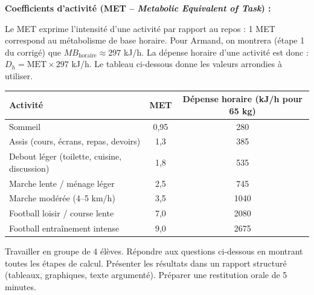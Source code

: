 \documentclass[11pt]{article}
\newcounter{popsec}
\newcounter{popsub}
\newcommand{\courssub}[1]{%
  \stepcounter{popsub}%
  \par\vspace{9pt}\noindent{\popxbold\fontsize{11.5}{13}\selectfont\color{popink}{\color{poporange}\thepopsec.\thepopsub}\hspace{6pt}#1}\par\nopagebreak\vspace{4pt}
}
\begin{document}
\par
\textbf{Coefficients d'activité (MET -- \emph{Metabolic Equivalent of Task}) :}
\par
Le MET exprime l'intensité d'une activité par rapport au repos : 1 MET correspond au métabolisme de base horaire. Pour Armand, on montrera (étape 1 du corrigé) que $MB_{\text{horaire}} \approx 297$ kJ/h. La dépense horaire d'une activité est donc : $D_h = \text{MET} \times 297$ kJ/h. Le tableau ci-dessous donne les valeurs arrondies à utiliser.

\begin{center}
\begin{tabular}{|l|c|c|}\hline
\rowcolor{poporangeL}
\textbf{Activité} & \textbf{MET} & \textbf{Dépense horaire (kJ/h pour 65 kg)} \\ \hline
Sommeil & 0,95 & 280 \\ \hline
Assis (cours, écrans, repas, devoirs) & 1,3 & 385 \\ \hline
Debout léger (toilette, cuisine, discussion) & 1,8 & 535 \\ \hline
Marche lente / ménage léger & 2,5 & 745 \\ \hline
Marche modérée (4--5 km/h) & 3,5 & 1040 \\ \hline
Football loisir / course lente & 7,0 & 2080 \\ \hline
Football entraînement intense & 9,0 & 2675 \\ \hline
\end{tabular}
\end{center}

\courssub{Consignes}
\par
Travailler en groupe de 4 élèves. Répondre aux questions ci-dessous en montrant toutes les étapes de calcul. Présenter les résultats dans un rapport structuré (tableaux, graphiques, texte argumenté). Préparer une restitution orale de 5 minutes.
\end{document}
